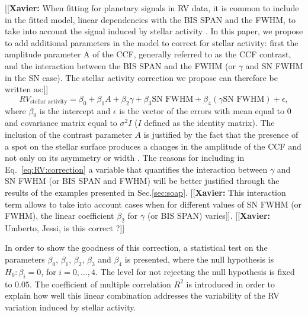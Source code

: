 \documentclass[11pt, oneside]{article}
\def\logrhk{$\log$(R$^{\prime}_{HK}$)}
\newcommand{\xavier}[1]{{\color{blue}[[\textbf{Xavier: }#1]]}}
\begin{document}
\xavier{When fitting for planetary signals in RV data, it is common to include in the fitted model, linear dependencies with the BIS SPAN and the FWHM, to take into account the signal induced by stellar activity \citep[e.g.][]{Dumusque:2017aa,Feng:2017aa}.
In this paper, we propose to add additional parameters in the model to correct for stellar activity: first the amplitude parameter A of the CCF, generally referred to as the CCF contrast, and the interaction between the BIS SPAN and the FWHM (or $\gamma$ and SN FWHM in the SN case). The stellar activity correction we propose can therefore be written as:}
%
\begin{equation}
RV_{\text{stellar activity}}= \beta_{0} + \beta_{1} A + \beta_{2} \gamma + \beta_{3} \text{SN FWHM} + \beta_{4} (\gamma  \text{SN FWHM})+\epsilon,
\label{eq:RV:correction}
\end{equation}
%
where $\beta_{0}$ is the intercept and $\epsilon$ is the vector of the errors with mean equal to $0$ and covariance matrix equal to $\sigma^{2}I$ ($I$ defined as the identity matrix). 
The inclusion of the contrast parameter $A$ is justified by the fact that the presence of a spot on the stellar surface produces a changes in the amplitude of the CCF and not only on its asymmetry or width \citep[see e.g. Fig. 2 in ][]{Dumusque-2014b}.
The reasons for including in Eq.~\ref{eq:RV:correction} a variable that quantifies the interaction between $\gamma$ and SN FWHM (or BIS SPAN and FWHM) will be better justified through the results of the examples presented in Sec.\ref{sec:soap}. 
\xavier{This interaction term allows to take into account cases when for different values of SN FWHM (or FWHM), the linear coefficient $\beta_{2}$ for $\gamma$ (or BIS SPAN) varies}. \xavier{Umberto, Jessi, is this correct ?}

In order to show the goodness of this correction, a statistical test on the parameters $\beta_{0}$, $\beta_{1}$, $\beta_{2}$, $\beta_{3}$ and $\beta_{4}$ is presented, where the null hypothesis is $H_{0}: \beta_{i}=0$, for $i=0,\dots,4$. The level for not rejecting the null hypothesis is fixed to $0.05$. The coefficient of multiple correlation $R^2$ is introduced in order to explain how well this linear combination addresses the variability of the RV variation induced by stellar activity. 
\end{document}
